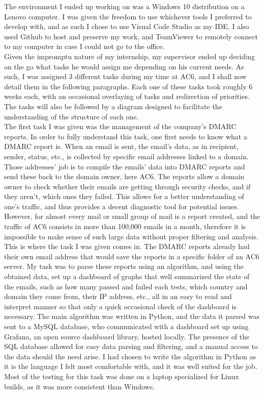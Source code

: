 \documentclass[12pt]{article}
\begin{document}
The environment I ended up working on was a Windows 10 distribution on a Lenovo computer. I was given the freedom to use whichever tools I preferred to develop with, and as such I chose to use Visual Code Studio as my IDE. I also used Github to host and preserve my work, and TeamViewer to remotely connect to my computer in case I could not go to the office. \\
Given the impromptu nature of my internship, my supervisor ended up deciding on the go what tasks he would assign me depending on his current needs. As such, I was assigned 3 different tasks during my time at AC6, and I shall now detail them in the following paragraphs. Each one of these tasks took roughly 6 weeks each, with an occasional overlaying of tasks and redirection of priorities. The tasks will also be followed by a diagram designed to facilitate the understanding of the structure of each one. \\
The first task I was given was the management of the company's DMARC reports. In order to fully understand this task, one first needs to know what a DMARC report is. When an email is sent, the email's data, as in recipient, sender, status, etc., is collected by specific email addresses linked to a domain. Those addresses' job is to compile the emails' data into DMARC reports and send these back to the domain owner, here AC6. The reports allow a domain owner to check whether their emails are getting through security checks, and if they aren't, which ones they failed. This allows for a better understanding of one's traffic, and thus provides a decent diagnostic tool for potential issues. However, for almost every mail or small group of mail is a report created, and the traffic of AC6 consists in more than 100,000 emails in a month, therefore it is impossible to make sense of such large data without proper filtering and analysis. This is where the task I was given comes in. The DMARC reports already had their own email address that would save the reports in a specific folder of an AC6 server. My task was to parse these reports using an algorithm, and using the obtained data, set up a dashboard of graphs that well summarized the state of the emails, such as how many passed and failed each tests, which country and domain they come from, their IP address, etc., all in an easy to read and interpret manner so that only a quick occasional check of the dashboard is necessary. The main algorithm was written in Python, and the data it parsed was sent to a MySQL database, who communicated with a dashboard set up using Grafana, an open source dashboard library, hosted locally. The presence of the SQL database allowed for easy data parsing and filtering, and a manual access to the data should the need arise. I had chosen to write the algorithm in Python as it is the language I felt most comfortable with, and it was well suited for the job. Most of the testing for this task was done on a laptop specialized for Linux builds, as it was more consistent than Windows. \\
\end{document}
